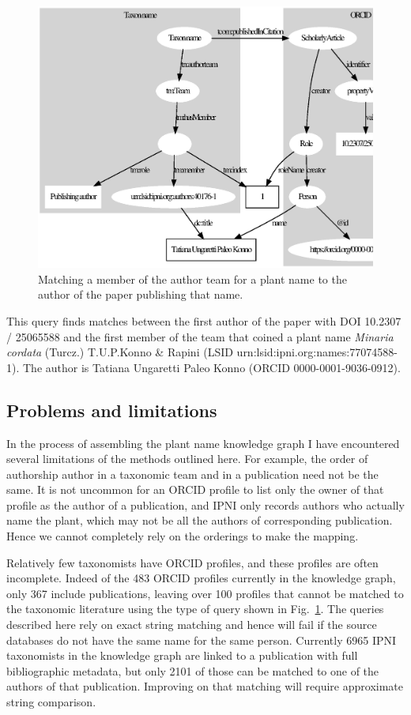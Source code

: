 \documentclass[runningheads]{llncs}
\begin{document}
\begin{figure}
\includegraphics[width=\textwidth]{ipni.eps}
\caption{Matching a member of the author team for a plant name to the author of the paper publishing that name.} \label{figipni}
\end{figure}

This query finds matches between the first author of the paper with DOI 10.2307 / 25065588 \cite{konno_new_2006} and the first member of the team that coined a plant name  \textit{Minaria cordata} (Turcz.) T.U.P.Konno \& Rapini (LSID urn:lsid:ipni.org:names:77074588-1). The author is Tatiana Ungaretti Paleo Konno (ORCID 0000-0001-9036-0912).


\subsection{Problems and limitations}

In the process of assembling the plant name knowledge graph I have encountered several limitations of the methods outlined here. For example, the order of authorship author in a taxonomic team and in a publication need not be the same. It is not uncommon for an ORCID profile to list only the owner of that profile as the author of a publication, and IPNI only records authors who actually name the plant, which may not be all the authors of corresponding publication. Hence we cannot completely rely on the orderings to make the mapping. 

Relatively few taxonomists have ORCID profiles, and these profiles are often incomplete. Indeed of the 483 ORCID profiles currently in the knowledge graph, only 367 include publications, leaving over 100 profiles that cannot be matched to the taxonomic literature using the type of query shown in Fig.~\ref{figipni}. The queries described here rely on exact string matching and hence will fail if the source databases do not have the same name for the same person. Currently 6965 IPNI taxonomists in the knowledge graph are linked to a publication with full bibliographic metadata, but only 2101 of those can be matched to one of the authors of that publication. Improving on that matching will require approximate string comparison.
\end{document}

